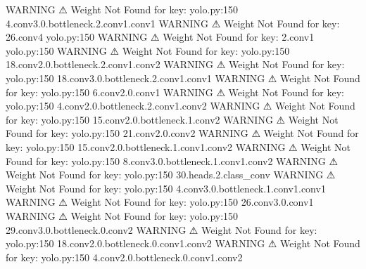                     WARNING  ⚠ Weight Not Found for key:               yolo.py:150
                             4.conv3.0.bottleneck.2.conv1.conv1                   
                    WARNING  ⚠ Weight Not Found for key: 26.conv4      yolo.py:150
                    WARNING  ⚠ Weight Not Found for key: 2.conv1       yolo.py:150
                    WARNING  ⚠ Weight Not Found for key:               yolo.py:150
                             18.conv2.0.bottleneck.2.conv1.conv2                  
                    WARNING  ⚠ Weight Not Found for key:               yolo.py:150
                             18.conv3.0.bottleneck.2.conv1.conv1                  
                    WARNING  ⚠ Weight Not Found for key:               yolo.py:150
                             6.conv2.0.conv1                                      
                    WARNING  ⚠ Weight Not Found for key:               yolo.py:150
                             4.conv2.0.bottleneck.2.conv1.conv2                   
                    WARNING  ⚠ Weight Not Found for key:               yolo.py:150
                             15.conv2.0.bottleneck.1.conv2                        
                    WARNING  ⚠ Weight Not Found for key:               yolo.py:150
                             21.conv2.0.conv2                                     
                    WARNING  ⚠ Weight Not Found for key:               yolo.py:150
                             15.conv2.0.bottleneck.1.conv1.conv2                  
                    WARNING  ⚠ Weight Not Found for key:               yolo.py:150
                             8.conv3.0.bottleneck.1.conv1.conv2                   
                    WARNING  ⚠ Weight Not Found for key:               yolo.py:150
                             30.heads.2.class_conv                                
                    WARNING  ⚠ Weight Not Found for key:               yolo.py:150
                             4.conv3.0.bottleneck.1.conv1.conv1                   
                    WARNING  ⚠ Weight Not Found for key:               yolo.py:150
                             26.conv3.0.conv1                                     
                    WARNING  ⚠ Weight Not Found for key:               yolo.py:150
                             29.conv3.0.bottleneck.0.conv2                        
                    WARNING  ⚠ Weight Not Found for key:               yolo.py:150
                             18.conv2.0.bottleneck.0.conv1.conv2                  
                    WARNING  ⚠ Weight Not Found for key:               yolo.py:150
                             4.conv2.0.bottleneck.0.conv1.conv2                   
